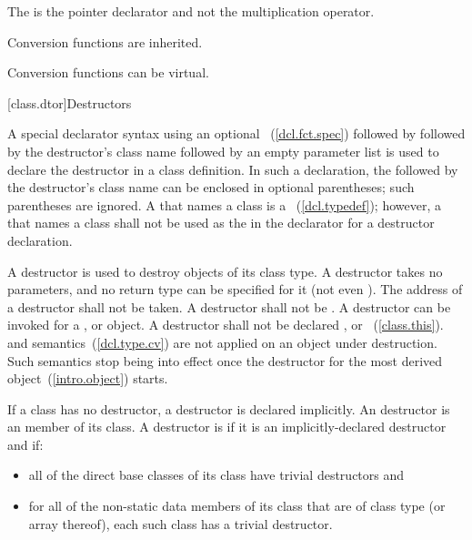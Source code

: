 The \tcode{*} is the pointer declarator and not the multiplication operator.
\exitexample
\exitnote

\pnum
{}%
Conversion functions are inherited.

\pnum
{}%
Conversion functions can be virtual.

[class.dtor]{Destructors}%

\pnum
A special declarator syntax using an optional
~(\ref{dcl.fct.spec}) followed by
\tcode{\~{}}
followed by the destructor's class name
followed by an empty parameter list
is used to declare the destructor in a class definition.
In such a declaration, the
\tcode{\~{}}
followed by the destructor's class name can be enclosed in optional parentheses;
such parentheses are ignored.
A
that names a class is a
~(\ref{dcl.typedef});
however, a
that names a class shall not be used as the
in the declarator for a destructor declaration.

\pnum
A destructor is used to destroy objects of its class type.
%
A destructor takes no parameters, and no return type can be
specified for it (not even
).
The address of a destructor shall not be taken.
A destructor shall not be
.
%
%
A destructor can be invoked for a
,
or
object.
A destructor shall not be declared
,
or
~(\ref{class.this}).
and
semantics~(\ref{dcl.type.cv}) are not applied on an object under destruction.
Such semantics stop being into effect once the destructor for the
most derived object~(\ref{intro.object}) starts.

\pnum
{}%
%
%
If a class has no 
destructor, a destructor is declared implicitly.
An  destructor is an
member of its class.
A destructor is  if it is an implicitly-declared destructor
and if:

\begin{itemize}
\item all of the direct base classes of its class have trivial destructors and

\item for all of the non-static data members of its class that are of class
type (or array thereof), each such class has a trivial destructor.
\end{itemize}

